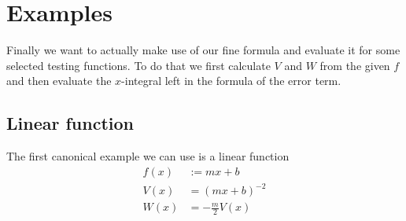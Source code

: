 \section{Examples}
Finally we want to actually make use of our fine formula and evaluate it for
some selected testing functions. To do that we first calculate $V$ and $W$ from
the given $f$ and then evaluate the $x$-integral left in the formula of the
error term.

\subsection{Linear function}
The first canonical example we can use is a linear function
\begin{align}
  f(x) &:= mx + b \\
  V(x) &= (mx + b)^{-2} \\
  W(x) &= -\frac m 2 V(x)
\end{align}
